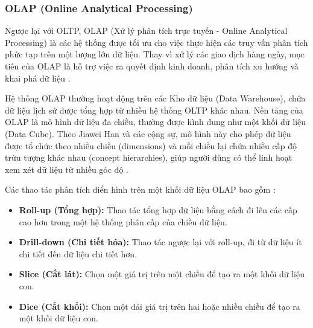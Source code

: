 \subsubsection{OLAP (Online Analytical Processing)}
Ngược lại với OLTP, OLAP (Xử lý phân tích trực tuyến - Online Analytical Processing) là các hệ thống được tối ưu cho việc thực hiện các truy vấn phân tích phức tạp trên một lượng lớn dữ liệu. Thay vì xử lý các giao dịch hàng ngày, mục tiêu của OLAP là hỗ trợ việc ra quyết định kinh doanh, phân tích xu hướng và khai phá dữ liệu \cite{pareek2007business}.

Hệ thống OLAP thường hoạt động trên các Kho dữ liệu (Data Warehouse), chứa dữ liệu lịch sử được tổng hợp từ nhiều hệ thống OLTP khác nhau. Nền tảng của OLAP là mô hình dữ liệu đa chiều, thường được hình dung như một khối dữ liệu (Data Cube). Theo Jiawei Han và các cộng sự, mô hình này cho phép dữ liệu được tổ chức theo nhiều chiều (dimensions) và mỗi chiều lại chứa nhiều cấp độ trừu tượng khác nhau (concept hierarchies), giúp người dùng có thể linh hoạt xem xét dữ liệu từ nhiều góc độ \cite{han2011datamining}.

Các thao tác phân tích điển hình trên một khối dữ liệu OLAP bao gồm \cite{han2011datamining}:
\begin{itemize}
    \item \textbf{Roll-up (Tổng hợp):} Thao tác tổng hợp dữ liệu bằng cách đi lên các cấp cao hơn trong một hệ thống phân cấp của chiều dữ liệu.
    \item \textbf{Drill-down (Chi tiết hóa):} Thao tác ngược lại với roll-up, đi từ dữ liệu ít chi tiết đến dữ liệu chi tiết hơn.
    \item \textbf{Slice (Cắt lát):} Chọn một giá trị trên một chiều để tạo ra một khối dữ liệu con.
    \item \textbf{Dice (Cắt khối):} Chọn một dải giá trị trên hai hoặc nhiều chiều để tạo ra một khối dữ liệu con.
\end{itemize}

